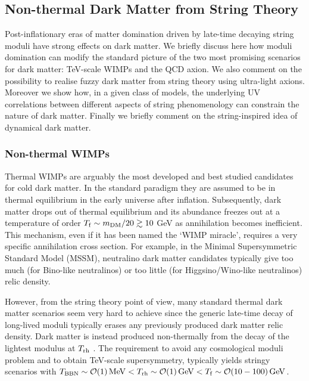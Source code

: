 \subsection{Non-thermal Dark Matter from String Theory}

Post-inflationary eras of matter domination driven by late-time decaying string moduli have strong effects on dark matter. We briefly discuss here how moduli domination can modify the standard picture of the two most promising scenarios for dark matter: TeV-scale WIMPs and the QCD axion. We also comment on the possibility to realise fuzzy dark matter from string theory using ultra-light axions. Moreover we show how, in a given class of models, the underlying UV correlations between different aspects of string phenomenology can constrain the nature of dark matter. Finally we briefly comment on the string-inspired idea of dynamical dark matter.

\subsubsection{Non-thermal WIMPs}

Thermal WIMPs are arguably the most developed and best studied candidates for cold dark matter. In the standard paradigm they are assumed to be in thermal equilibrium in the early universe after inflation. Subsequently, dark matter drops out of thermal equilibrium and its abundance freezes out at a temperature of order $T_{\rm f} \sim m_{\rm DM}/20 \gtrsim 10$ GeV as annihilation becomes inefficient. This mechanism, even if it has been named the `WIMP miracle', requires a very specific annihilation cross section. For example, in the Minimal Supersymmetric Standard Model (MSSM), neutralino dark matter candidates typically give too much (for Bino-like neutralinos) or too little (for Higgsino/Wino-like neutralinos) relic density. 

However, from the string theory point of view, many standard thermal dark matter scenarios seem very hard to achieve since the generic late-time decay of long-lived moduli typically erases any previously produced dark matter relic density. Dark matter is instead 
produced non-thermally from the decay of the lightest modulus at $T_{\rm rh}$ \cite{Moroi:1999zb, Acharya:2008bk, Acharya:2009zt, Allahverdi:2013noa, 14091222, Allahverdi:2014ppa, Aparicio:2015sda, 150205406, 150804144, 151106768, Aparicio:2016qqb, Allahverdi:2018iod, Allahverdi:2020uax, 220106633, Cicoli:2022uqa}. The requirement to avoid any cosmological moduli problem and to obtain TeV-scale supersymmetry, typically yields stringy scenarios with $T_{\rm BBN} \sim \mathcal{O}(1)\,{\rm MeV} < T_{\rm rh}\sim \mathcal{O}(1)\,{\rm GeV} < T_{\rm f}\sim\mathcal{O}(10-100)\,{\rm GeV}$. 

